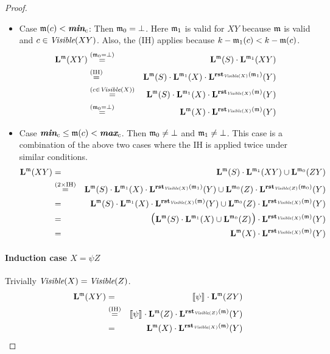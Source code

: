 \begin{proof}
\begin{itemize}
    \item Case $\mathfrak{m}(c)<\textit{\textbf{min}}_{c}$:
  Then $\mathfrak{m}_0=\bot$.
  Here
  $\mathfrak{m}_1$ is valid for $XY$ because $\mathfrak{m}$ is valid and $c\in\textit{Visible}(XY)$.
  Also, the (IH) applies because $k-\mathfrak{m}_1(c) < k-\mathfrak{m}(c)$.
  \begin{eqnarray*}
    \mathbf{L}^{\mathfrak{m}}(XY) &\stackrel{(\mathfrak{m}_0=\bot)}{=}&
    \mathbf{L}^{\mathfrak{m}}(S)\cdot\mathbf{L}^{\mathfrak{m}_1}(XY)\\
    &\stackrel{\textrm{(IH)}}{=}&
    \mathbf{L}^{\mathfrak{m}}(S)\cdot\mathbf{L}^{\mathfrak{m}_1}(X)\cdot\mathbf{L}^{\textbf{rst}_{\textit{Visible}(X)}(\mathfrak{m}_1)}(Y) \\
    &\stackrel{(c\in\textit{Visible}(X))}{=}&
    \mathbf{L}^{\mathfrak{m}}(S)\cdot\mathbf{L}^{\mathfrak{m}_1}(X)\cdot\mathbf{L}^{\textbf{rst}_{\textit{Visible}(X)}(\mathfrak{m})}(Y) \\
    &\stackrel{(\mathfrak{m}_0=\bot)}{=}&
    \mathbf{L}^{\mathfrak{m}}(X)\cdot\mathbf{L}^{\textbf{rst}_{\textit{Visible}(X)}(\mathfrak{m})}(Y)
  \end{eqnarray*}

\item Case $\textit{\textbf{min}}_{c} \leq \mathfrak{m}(c) < \textit{\textbf{max}}_{c}$.
  Then $\mathfrak{m}_0\neq\bot$ and $\mathfrak{m}_1\neq\bot$.
  This case is a combination of the above two cases where the IH is applied twice
  under similar conditions.
  \begin{eqnarray*}
    \mathbf{L}^{\mathfrak{m}}(XY) &=&
    \mathbf{L}^{\mathfrak{m}}(S)\cdot\mathbf{L}^{\mathfrak{m}_1}(XY)\cup\mathbf{L}^{\mathfrak{m}_0}(ZY)\\
    &\stackrel{\textrm{($2\times$IH)}}{=}&
    \mathbf{L}^{\mathfrak{m}}(S)\cdot\mathbf{L}^{\mathfrak{m}_1}(X)\cdot\mathbf{L}^{\textbf{rst}_{\textit{Visible}(X)}(\mathfrak{m}_1)}(Y)\cup
    \mathbf{L}^{\mathfrak{m}_0}(Z)\cdot\mathbf{L}^{\textbf{rst}_{\textit{Visible}(Z)}(\mathfrak{m}_0)}(Y) \\
     &=&
    \mathbf{L}^{\mathfrak{m}}(S)\cdot\mathbf{L}^{\mathfrak{m}_1}(X)\cdot\mathbf{L}^{\textbf{rst}_{\textit{Visible}(X)}(\mathfrak{m})}(Y)\cup 
    \mathbf{L}^{\mathfrak{m}_0}(Z)\cdot\mathbf{L}^{\textbf{rst}_{\textit{Visible}(X)}(\mathfrak{m})}(Y) \\
    &=&
    \textrm{\Large(} \mathbf{L}^{\mathfrak{m}}(S)\cdot\mathbf{L}^{\mathfrak{m}_1}(X)\cup 
    \mathbf{L}^{\mathfrak{m}_0}(Z)\textrm{\Large)} \cdot\mathbf{L}^{\textbf{rst}_{\textit{Visible}(X)}(\mathfrak{m})}(Y) \\
    &=&
    \mathbf{L}^{\mathfrak{m}}(X)\cdot\mathbf{L}^{\textbf{rst}_{\textit{Visible}(X)}(\mathfrak{m})}(Y)
  \end{eqnarray*}

  
    \end{itemize}
    
    \paragraph{Induction case $X=\psi Z$}    Trivially $\textit{Visible}(X)=\textit{Visible}(Z)$.
    \begin{eqnarray*}
      \mathbf{L}^{\mathfrak{m}}(XY) &=& [\![\psi]\!]_{{}}\cdot \mathbf{L}^{\mathfrak{m}}(ZY) \\
      &\stackrel{\textrm{(IH)}}{=}&
      [\![\psi]\!]_{{}}\cdot \mathbf{L}^{\mathfrak{m}}(Z)\cdot\mathbf{L}^{\textbf{rst}_{\textit{Visible}(Z)}(\mathfrak{m})}(Y) \\
    &=&
    \mathbf{L}^{\mathfrak{m}}(X)\cdot\mathbf{L}^{\textbf{rst}_{\textit{Visible}(X)}(\mathfrak{m})}(Y)
    \end{eqnarray*}


\end{proof}
